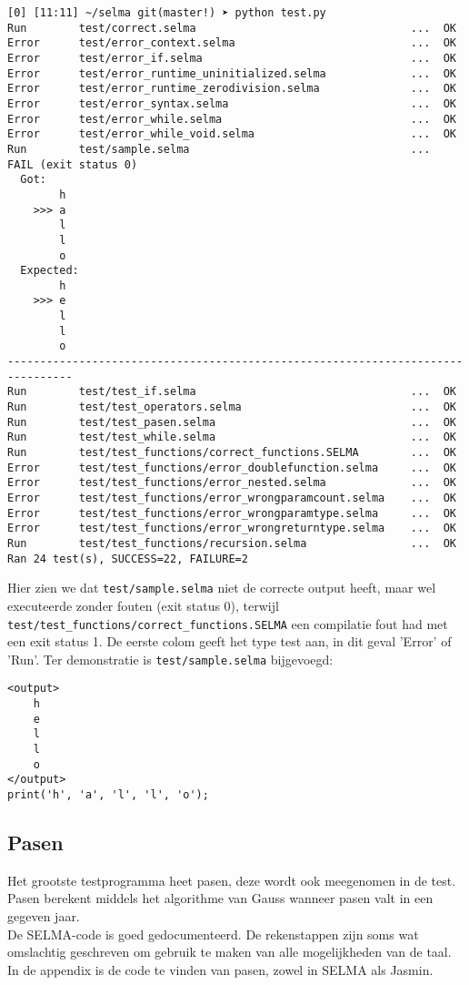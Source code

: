 \documentclass[]{article}
\begin{document}
\begin{lstlisting}[style=SELMA]
[0] [11:11] ~/selma git(master!) ➤ python test.py
Run        test/correct.selma                                 ...  OK
Error      test/error_context.selma                           ...  OK
Error      test/error_if.selma                                ...  OK
Error      test/error_runtime_uninitialized.selma             ...  OK
Error      test/error_runtime_zerodivision.selma              ...  OK
Error      test/error_syntax.selma                            ...  OK
Error      test/error_while.selma                             ...  OK
Error      test/error_while_void.selma                        ...  OK
Run        test/sample.selma                                  ...  FAIL (exit status 0)
  Got:
        h
    >>> a
        l
        l
        o
  Expected:
        h
    >>> e
        l
        l
        o
--------------------------------------------------------------------------------
Run        test/test_if.selma                                 ...  OK
Run        test/test_operators.selma                          ...  OK
Run        test/test_pasen.selma                              ...  OK
Run        test/test_while.selma                              ...  OK
Run        test/test_functions/correct_functions.SELMA        ...  OK
Error      test/test_functions/error_doublefunction.selma     ...  OK
Error      test/test_functions/error_nested.selma             ...  OK
Error      test/test_functions/error_wrongparamcount.selma    ...  OK
Error      test/test_functions/error_wrongparamtype.selma     ...  OK
Error      test/test_functions/error_wrongreturntype.selma    ...  OK
Run        test/test_functions/recursion.selma                ...  OK
Ran 24 test(s), SUCCESS=22, FAILURE=2

\end{lstlisting}

Hier zien we dat \texttt{test/sample.selma} niet de correcte output heeft, maar wel executeerde zonder fouten (exit status 0), terwijl \texttt{test/test\_functions/correct\_functions.SELMA} een compilatie fout had met een exit status 1. De eerste colom geeft het type test aan, in dit geval 'Error' of 'Run'. Ter demonstratie is \texttt{test/sample.selma} bijgevoegd:


\begin{lstlisting}[style=SELMA]
<output>
    h
    e
    l
    l
    o
</output>
print('h', 'a', 'l', 'l', 'o');
\end{lstlisting}

\subsection{Pasen}
Het grootste testprogramma heet pasen, deze wordt ook meegenomen in de test. Pasen berekent middels het algorithme van Gauss wanneer pasen valt in een gegeven jaar. \\
De SELMA-code is goed gedocumenteerd. De rekenstappen zijn soms wat omslachtig geschreven om gebruik te maken van alle mogelijkheden van de taal.\\
In de appendix is de code te vinden van pasen, zowel in SELMA als Jasmin.
\end{document}
